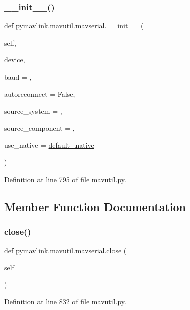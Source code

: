 \subsubsection{\texorpdfstring{\_\_init\_\_()}{\_\_init\_\_()}}
{\footnotesize\ttfamily def pymavlink.\+mavutil.\+mavserial.\+\_\+\+\_\+init\+\_\+\+\_\+ (\begin{DoxyParamCaption}\item[{}]{self,  }\item[{}]{device,  }\item[{}]{baud = {},  }\item[{}]{autoreconnect = {\ttfamily False},  }\item[{}]{source\+\_\+system = {},  }\item[{}]{source\+\_\+component = {},  }\item[{}]{use\+\_\+native = {\ttfamily \mbox{\hyperlink{namespacepymavlink_1_1mavutil_a21ce9da7b698a7bc21c44b9f77341b62}{default\+\_\+native}}} }\end{DoxyParamCaption})}



Definition at line 795 of file mavutil.\+py.



\subsection{Member Function Documentation}
\mbox{\label{classpymavlink_1_1mavutil_1_1mavserial_a3e2176f72a1c7590584597cb63d12eb2}} 
\subsubsection{\texorpdfstring{close()}{close()}}
{\footnotesize\ttfamily def pymavlink.\+mavutil.\+mavserial.\+close (\begin{DoxyParamCaption}\item[{}]{self }\end{DoxyParamCaption})}



Definition at line 832 of file mavutil.\+py.

\mbox{\label{classpymavlink_1_1mavutil_1_1mavserial_acd3d12828b5794091b0984d65c292770}} 
